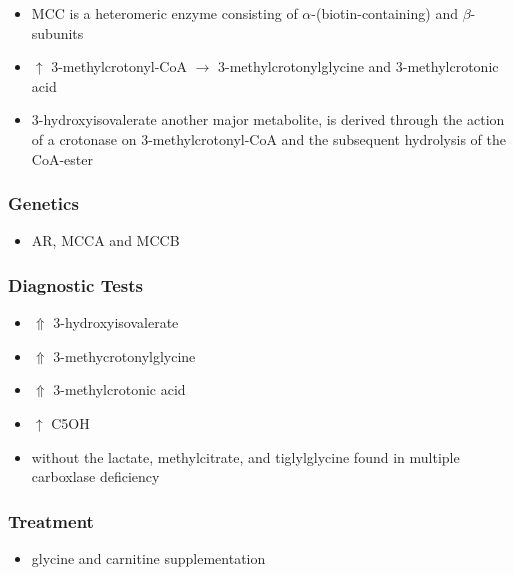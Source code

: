 \documentclass{scrartcl}
\begin{document}

\begin{itemize}
\item MCC is a heteromeric enzyme consisting of
\(\alpha\)-(biotin-containing) and \(\beta\)-subunits
\item \(\uparrow\) 3-methylcrotonyl-CoA \(\to\) 3-methylcrotonylglycine and
3-methylcrotonic acid
\item 3-hydroxyisovalerate another major metabolite, is derived
through the action of a crotonase on 3-methylcrotonyl-CoA and the
subsequent hydrolysis of the CoA-ester
\end{itemize}
\subsubsection{Genetics}
\label{sec:org082a929}
\begin{itemize}
\item AR, MCCA and MCCB
\end{itemize}
\subsubsection{Diagnostic Tests}
\label{sec:org55a2207}
\begin{itemize}
\item \(\Uparrow\) 3-hydroxyisovalerate
\item \(\Uparrow\) 3-methycrotonylglycine
\item \(\Uparrow\) 3-methylcrotonic acid
\item \(\uparrow\) C5OH
\item without the lactate, methylcitrate, and tiglylglycine found in
multiple carboxlase deficiency
\end{itemize}

\subsubsection{Treatment}
\label{sec:orgf85767c}
\begin{itemize}
\item glycine and carnitine supplementation
\end{itemize}
\end{document}
